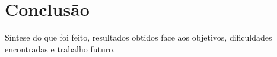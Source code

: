 \chapter{Conclusão}
\label{cap:conclusao}

Síntese do que foi feito, resultados obtidos face aos objetivos, dificuldades
encontradas e trabalho futuro.
